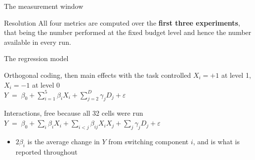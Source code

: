 \documentclass[aspectratio=169,11pt]{beamer}
\begin{document}
\begin{frame}{The measurement window}
  \vfill
  \begin{block}{Resolution}
    All four metrics are computed over the \textbf{first three experiments},
    that being the number performed at the fixed budget level and hence the
    number available in every run.
  \end{block}
\end{frame}

\begin{frame}{The regression model}
  \begin{block}{Orthogonal coding, then main effects with the task controlled}
    \centering
    $X_i = +1$ at level 1, \quad $X_i = -1$ at level 0\\[4pt]
    $Y \;=\; \beta_0 + \sum_{i=1}^{5}\beta_i X_i
       + \sum_{j=2}^{D}\gamma_j D_j + \varepsilon$
  \end{block}
  \vspace{-0.1cm}
  \begin{block}{Interactions, free because all 32 cells were run}
    \centering
    $Y \;=\; \beta_0 + \sum_{i}\beta_i X_i
       + \sum_{i<j}\beta_{ij}X_iX_j
       + \sum_{j}\gamma_j D_j + \varepsilon$
  \end{block}
  \vspace{-0.1cm}
  \begin{itemize}
    \item $2\beta_i$ is the average change in $Y$ from switching component $i$,
          and is what is reported throughout
  \end{itemize}
\end{frame}

\end{document}
